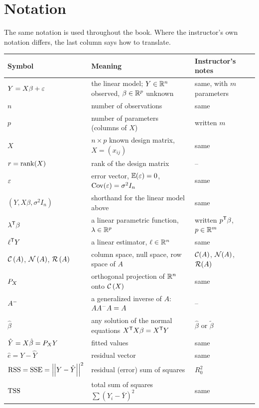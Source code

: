 \chapter*{Notation}

The same notation is used throughout the book. Where the instructor's own
notation differs, the last column says how to translate.

\begin{center}
\renewcommand{\arraystretch}{1.25}
\begin{tabular}{@{}p{3.4cm}p{7.2cm}p{4.6cm}@{}}
\hline
\textbf{Symbol} & \textbf{Meaning} & \textbf{Instructor's notes}\\\hline
$Y = X\beta + \varepsilon$ & the linear model; $Y\in\mathbb R^n$ observed, $\beta\in\mathbb R^p$ unknown & same, with $m$ parameters\\
$n$ & number of observations & same\\
$p$ & number of parameters (columns of $X$) & written $m$\\
$X$ & $n\times p$ known design matrix, $X=(x_{ij})$ & same\\
$r=\operatorname{rank}(X)$ & rank of the design matrix & --\\
$\varepsilon$ & error vector, $\mathbb E(\varepsilon)=0$, $\operatorname{Cov}(\varepsilon)=\sigma^2 I_n$ & same\\
$(Y,X\beta,\sigma^2 I_n)$ & shorthand for the linear model above & same\\
$\lambda^{\mathsf T}\beta$ & a linear parametric function, $\lambda\in\mathbb R^p$ & written $p^{\mathsf T}\beta$, $p\in\mathbb R^m$\\
$\ell^{\mathsf T} Y$ & a linear estimator, $\ell\in\mathbb R^n$ & same\\
$\mathcal{C}\left(A\right)$, $\mathcal{N}\left(A\right)$, $\mathcal{R}\left(A\right)$ & column space, null space, row space of $A$ & $\mathcal{C}(A)$, $\mathcal{N}(A)$, $\mathcal{R}(A)$\\
$P_X$ & orthogonal projection of $\mathbb R^n$ onto $\mathcal{C}\left(X\right)$ & same\\
$A^{-}$ & a generalized inverse of $A$: $AA^{-}A=A$ & --\\
$\hat\beta$ & any solution of the normal equations $X^{\mathsf T} X\beta = X^{\mathsf T} Y$ & $\hat\beta$ or $\tilde\beta$\\
$\hat Y = X\hat\beta=P_X Y$ & fitted values & same\\
$\hat e = Y-\hat Y$ & residual vector & same\\
$\mathrm{RSS}=\mathrm{SSE}=\left|\left|Y-\hat Y\right|\right|^2$ & residual (error) sum of squares & $R_0^2$\\
$\mathrm{TSS}$ & total sum of squares $\sum(Y_i-\bar Y)^2$ & same\\

\end{tabular}
\end{center}

